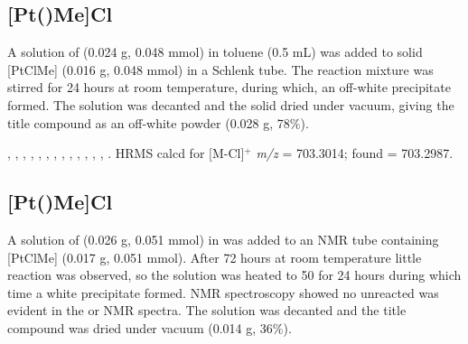 \subsection*{[Pt(\tBuxantphos)Me]Cl}
%

A solution of \tBuxantphos{} (0.024 g, 0.048 mmol) in toluene (0.5 mL) was added to solid [PtClMe] (0.016 g, 0.048 mmol) in a Schlenk tube.  The reaction mixture was stirred for 24 hours at room temperature, during which, an off-white precipitate formed.  The solution was decanted and the   solid dried under vacuum, giving the title compound as an off-white powder (0.028 g, 78\%).

,
,
,
,
,
,
,
,
,
,
,
,
,
.
HRMS calcd for  [M-Cl]$^+$ \emph{m/z} = 703.3014; found = 703.2987.



\subsection*{[Pt(\tBusixantphos)Me]Cl}


A solution of \tBusixantphos{} (0.026 g, 0.051 mmol) in  was added to an NMR tube containing [PtClMe] (0.017 g, 0.051 mmol).  After 72 hours at room temperature little reaction was observed, so the solution was heated to 50\degC{} for 24 hours during which time a white precipitate formed.  NMR spectroscopy showed no unreacted \tBusixantphos{} was evident in the \proton{} or \phosphorus{} NMR spectra.  The solution was decanted and the title compound was dried under vacuum (0.014 g, 36\%).  

